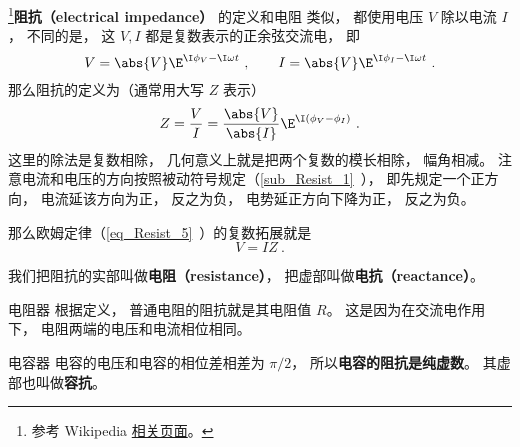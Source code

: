 
\begin{issues}
\issueDraft
\end{issues}


\footnote{参考 Wikipedia \href{https://en.wikipedia.org/wiki/Electrical_impedance}{相关页面}。}\textbf{阻抗（electrical impedance）} 的定义和电阻 类似， 都使用电压 $V$ 除以电流 $I$， 不同的是， 这 $V, I$ 都是复数表示的正余弦交流电， 即
\begin{equation}
V = \abs{V} \E^{\I \phi_V - \I \omega t}~,
\qquad
I = \abs{V} \E^{\I \phi_I - \I \omega t}~.
\end{equation}
那么阻抗的定义为（通常用大写 $Z$ 表示）
\begin{equation}
Z = \frac{V}{I} = \frac{\abs{V}}{\abs{I}} \E^{\I (\phi_V - \phi_I)}~.
\end{equation}
这里的除法是复数相除， 几何意义上就是把两个复数的模长相除， 幅角相减。 注意电流和电压的方向按照被动符号规定（\autoref{sub_Resist_1}~）， 即先规定一个正方向， 电流延该方向为正， 反之为负， 电势延正方向下降为正， 反之为负。

那么欧姆定律（\autoref{eq_Resist_5}~）的复数拓展就是
\begin{equation}
V = IZ~.
\end{equation}

我们把阻抗的实部叫做\textbf{电阻（resistance）}， 把虚部叫做\textbf{电抗（reactance）}。

\begin{example}{电阻器}\label{ex_impeda_1}
根据定义， 普通电阻的阻抗就是其电阻值 $R$。 这是因为在交流电作用下， 电阻两端的电压和电流相位相同。
\end{example}

\begin{example}{电容器}
电容的电压和电容的相位差相差为 $\pi/2$， 所以\textbf{电容的阻抗是纯虚数}。 其虚部也叫做\textbf{容抗}。
\end{example}
